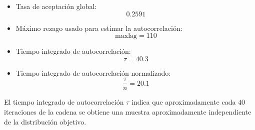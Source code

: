 \documentclass[12pt,spanish,mexico]{article}
\numberwithin{equation}{section}
\theoremstyle{definition}
\theoremstyle{remark}
\begin{document}
\begin{enumerate}[label=(\alph*)]
\begin{itemize}
    \item Tasa de aceptación global:
    \[
    0.2591
    \]

    \item Máximo rezago usado para estimar la autocorrelación:
    \[
    \text{maxlag} = 110
    \]

    \item Tiempo integrado de autocorrelación:
    \[
    \tau = 40.3
    \]

    \item Tiempo integrado de autocorrelación normalizado:
    \[
    \frac{\tau}{n} = 20.1
    \]
\end{itemize}

El tiempo integrado de autocorrelación $\tau$ indica que aproximadamente cada $40$ iteraciones de la cadena se obtiene una muestra aproximadamente independiente de la distribución objetivo.
\end{enumerate}
\end{document}
